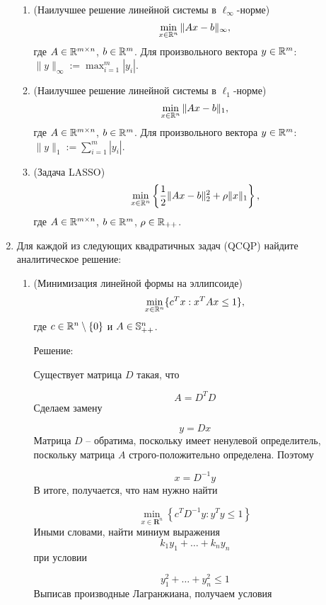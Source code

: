 \documentclass{article}
\begin{document}
\begin{enumerate}[label=\textbf{\arabic*}, leftmargin=0em]
\begin{enumerate}
\item (Наилучшее решение линейной системы в $\ell_{\infty}$-норме)
\begin{equation}
\min_{x \in \R^n} \| A x - b \|_{\infty},
\end{equation}
где $A \in \R^{m \times n}$, $b \in \R^m$. Для произвольного вектора $y \in \R^m$: $\| y \|_{\infty} := \max_{i=1}^m |y_i|$.
\item (Наилучшее решение линейной системы в $\ell_1$-норме)
\begin{equation}
\min_{x \in \R^n} \| A x - b \|_1,
\end{equation}
где $A \in \R^{m \times n}$, $b \in \R^m$. Для произвольного вектора $y \in \R^m$: $\| y \|_1 := \sum_{i=1}^m |y_i|$.
\item (Задача LASSO)
\begin{equation}
\min_{x \in \R^n} \left\{ \frac{1}{2} \| A x - b \|_2^2 + \rho \| x \|_1 \right\},
\end{equation}
где $A \in \R^{m \times n}$, $b \in \R^m$, $\rho \in \R_{++}$.

\end{enumerate}

\item Для каждой из следующих квадратичных задач (QCQP) найдите аналитическое решение:
\begin{enumerate}
\item (Минимизация линейной формы на эллипсоиде)
\begin{equation}
\min_{x \in \R^n} \{ c^T x : x^T A x \leq 1 \},
\end{equation}
где $c \in \R^n \setminus \{0\}$ и $A \in \S^n_{++}$.

Решение:

Существует матрица $D$ такая, что

$$
A = D^T D
$$
Сделаем замену

$$
y = Dx
$$
Матрица $D$ -- обратима, поскольку имеет ненулевой определитель, поскольку матрица $A$ строго-положительно определена. Поэтому

$$
x = D^{-1}y
$$
В итоге, получается, что нам нужно найти

$$
\min_{x \in \mathbf{R}^n} \left\{c^T D^{-1}y : y^T y \leq 1\right\}
$$
Иными словами, найти миниум выражения
$$
k_1 y_1 + \ldots + k_n y_n
$$
при условии

$$
y_1^2 + \ldots + y_n^2 \leq 1
$$
Выписав производные Лагранжиана, получаем условия


\end{enumerate}
\end{enumerate}
\end{document}
